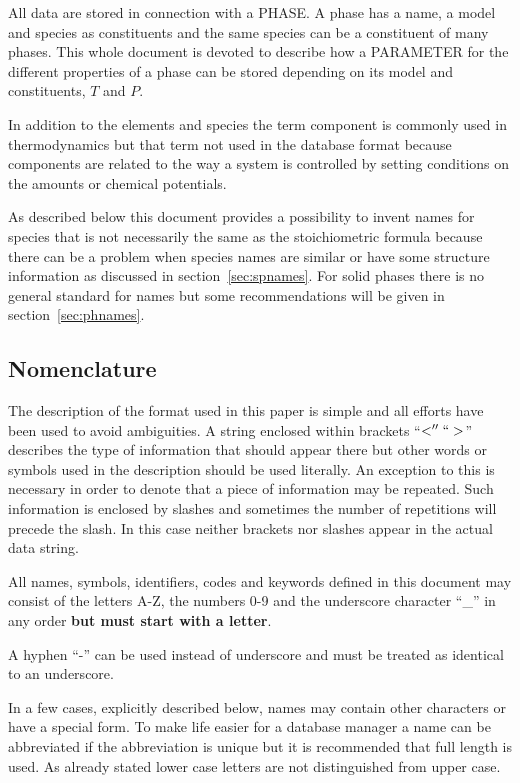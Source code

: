 \documentclass[12pt]{article}
\begin{document}
All data are stored in connection with a PHASE.  A phase has a name, a
model and species as constituents and the same species can be a
constituent of many phases.  This whole document is devoted to
describe how a PARAMETER for the different properties of a phase can
be stored depending on its model and constituents, $T$ and $P$.

In addition to the elements and species the term component is commonly
used in thermodynamics but that term not used in the database format
because components are related to the way a system is controlled by
setting conditions on the amounts or chemical potentials.

As described below this document provides a possibility to invent
names for species that is not necessarily the same as the
stoichiometric formula because there can be a problem when species
names are similar or have some structure information as discussed in
section~\ref{sec:spnames}.  For solid phases there is no general
standard for names but some recommendations will be given in
section~\ref{sec:phnames}.

\subsection{Nomenclature}

The description of the format used in this paper is simple and all
efforts have been used to avoid ambiguities.  A string enclosed within
brackets ``$<'' ``>$'' describes the type of information that should
appear there but other words or symbols used in the description should
be used literally.  An exception to this is necessary in order to
denote that a piece of information may be repeated.  Such information
is enclosed by slashes and sometimes the number of repetitions will
precede the slash.  In this case neither brackets nor slashes appear
in the actual data string.

All names, symbols, identifiers, codes and keywords defined in this
document may consist of the letters A-Z, the numbers 0-9 and the
underscore character ``\_'' in any order {\bf but must start with a
  letter}.  

A hyphen ``-'' can be used instead of underscore and must be treated
as identical to an underscore.

In a few cases, explicitly described below, names may contain other
characters or have a special form.  To make life easier for a database
manager a name can be abbreviated if the abbreviation is unique but it
is recommended that full length is used.  As already stated lower case
letters are not distinguished from upper case.
\end{document}
